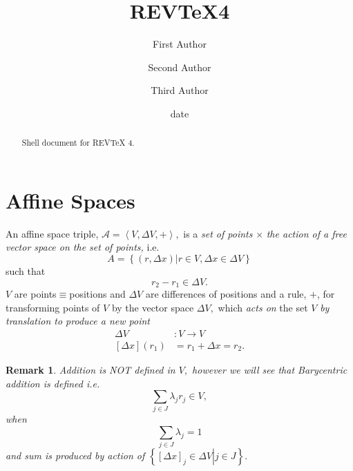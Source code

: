 \documentclass[aps,preprint]{revtex4}%
\newtheorem{remark}[theorem]{Remark}
\begin{document}
\title[Short title for running header]{REV\TeX4}
\author{First Author}
\author{Second Author}
\author{Third Author}

\begin{abstract}
Shell document for REV\TeX{} 4.

\end{abstract}
\date[Date text]{date}




\maketitle
\tableofcontents


\section{Affine Spaces}

An affine space triple, $\mathcal{A}=\left\langle V,\Delta V,+\right\rangle ,$
is a \emph{set of points} $\times$ \emph{the action of a free vector space on
the set of points,} i.e.
\begin{equation}
A=\left\{  \left.  \left(  r,\Delta x\right)  \right\vert r\in V,\Delta
x\in\Delta V\right\}
\end{equation}
such that
\begin{equation}
r_{2}-r_{1}\in\Delta V.
\end{equation}
$V$ are points$\equiv$positions and $\Delta V$ are differences of positions
and a rule, $+$, for transforming points of $V$ by the vector space $\Delta
V,$ which \emph{acts on} the set $V$ \emph{by translation to produce a new
point }
\begin{align}
\Delta V  &  :V\rightarrow V\\
\left[  \Delta x\right]  \left(  r_{1}\right)   &  =r_{1}+\Delta x=r_{2}.
\end{align}


\begin{remark}
Addition is NOT defined in $V,$ however we will see that \emph{Barycentric
addition} is defined i.e.
\begin{equation}
\sum_{j\in J}\lambda_{j}r_{j}\in V,
\end{equation}
when
\begin{equation}
\sum_{j\in J}\lambda_{j}=1
\end{equation}
and sum is produced by action of $\left\{  \left.  \left[  \Delta x\right]
_{j}\in\Delta V\right\vert j\in J\right\}  .$
\end{remark}
\end{document}
